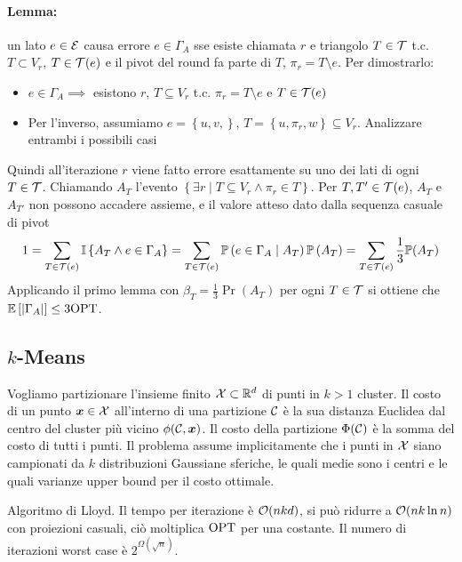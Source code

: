 \paragraph{Lemma:} un lato $e \in \mathcal{E}$ causa errore $e \in \Gamma_A$ sse esiste chiamata $r$ e triangolo $T \in \mathcal{T}$ t.c. $T \subset V_r$, $T \in \mathcal{T}(e)$ e il pivot del round fa parte di $T$, $\pi_r = T \setminus e$. Per dimostrarlo: 
\begin{itemize}
	\item $e \in \Gamma_A \implies$ esistono $r$, $T \subseteq V_r$ t.c. $\pi_r = T \setminus e$ e $T \in \mathcal{T}(e)$
	
	\item Per l'inverso, assumiamo $e = \left\{u,v,\right\}$, $T = \left\{u, \pi_r, w\right\} \subseteq V_r$. Analizzare entrambi i possibili casi
\end{itemize}
Quindi all'iterazione $r$ viene fatto errore esattamente su uno dei lati di ogni $T \in \mathcal{T}$. Chiamando $A_T$ l'evento $\left\{ \exists r \mid T \subseteq V_r \wedge \pi_r \in T \right\}$. Per $T,T' \in \mathcal{T}(e)$, $A_T$ e $A_{T'}$ non possono accadere assieme, e il valore atteso dato dalla sequenza casuale di pivot 
$$ 1 = \sum_{T \in \mathcal{T}(e)} \mathbb{I} \left\{A_T \wedge e \in \Gamma_A \right\} = \sum_{T \in \mathcal{T}(e)} \mathbb{P} \left(e \in \Gamma_A \mid A_T \right) \mathbb{P} \left(A_T\right) = \sum_{T \in \mathcal{T}(e)} \frac{1}{3} \mathbb{P} (A_T) $$
Applicando il primo lemma con $\beta_T = \frac{1}{3} \Pr (A_T)$ per ogni $T \in \mathcal{T}$ si ottiene che $\mathbb{E}\left[|\Gamma_A|\right] \leq 3 \textnormal{OPT}$.

\subsection{$k$-Means}

Vogliamo partizionare l'insieme finito $\mathcal{X} \subset \mathbb{R}^d$ di punti in $k>1$ cluster. Il costo di un punto $\bm x \in \mathcal{X}$ all'interno di una partizione $\mathcal{C}$ è la sua distanza Euclidea dal centro del cluster più vicino $\phi(\mathcal{C}, \bm x)$. Il costo della partizione $\Phi(\mathcal{C})$ è la somma del costo di tutti i punti. Il problema assume implicitamente che i punti in $\mathcal{X}$ siano campionati da $k$ distribuzioni Gaussiane sferiche, le quali medie sono i centri e le quali varianze upper bound per il costo ottimale.

Algoritmo di Lloyd. Il tempo per iterazione è $\mathcal{O} (nkd)$, si può ridurre a $\mathcal{O}(n k \ln n)$ con proiezioni casuali, ciò moltiplica $\textnormal{OPT}$ per una costante. Il numero di iterazioni worst case è $2^{\Omega\left(\sqrt{n}\right)}$.

